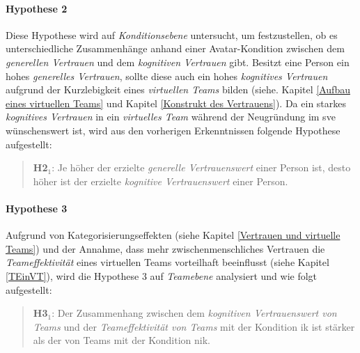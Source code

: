 \documentclass[a4paper,11pt]{article}%
\renewcommand{\\}{\vspace*{0.5\baselineskip} \newline}
\begin{document}
{\paragraph{Hypothese 2}
Diese Hypothese wird auf \textit{Konditionsebene} untersucht, um festzustellen, ob es unterschiedliche Zusammenhänge anhand einer Avatar-Kondition zwischen dem \textit{generellen Vertrauen} und dem \textit{kognitiven Vertrauen} gibt. Besitzt eine Person ein hohes \textit{generelles Vertrauen}, sollte diese auch ein hohes \textit{kognitives Vertrauen} aufgrund der Kurzlebigkeit eines \textit{virtuellen Teams} bilden (siehe. Kapitel \ref{Aufbau eines virtuellen Teams} und Kapitel \ref{Konstrukt des Vertrauens}).
Da ein starkes \textit{kognitives Vertrauen} in ein \textit{virtuelles Team} während der Neugründung im \ac{sve} wünschenswert ist, wird aus den vorherigen Erkenntnissen folgende Hypothese aufgestellt:
\begin{quote}
\textbf{H2$_{1}$}: Je höher der erzielte \textit{generelle Vertrauenswert} einer Person ist, desto höher ist der erzielte \textit{kognitive Vertrauenswert} einer Person.
\end{quote}

\paragraph{Hypothese 3}
Aufgrund von Kategorisierungseffekten (siehe Kapitel \ref{Vertrauen und virtuelle Teams}) und der Annahme, dass mehr zwischenmenschliches Vertrauen die \textit{Teameffektivität} eines virtuellen Teams vorteilhaft beeinflusst (siehe Kapitel \ref{TEinVT}), wird die Hypothese 3 auf \textit{Teamebene} analysiert und wie folgt aufgestellt: 
\begin{quote}
\textbf{H3$_{1}$}: Der Zusammenhang zwischen dem \textit{kognitiven Vertrauenswert von Teams} und der \textit{Teameffektivität von Teams} mit der Kondition \ac{ik} ist stärker als der von Teams mit der Kondition \ac{nik}.
\end{quote}

}
\end{document}

